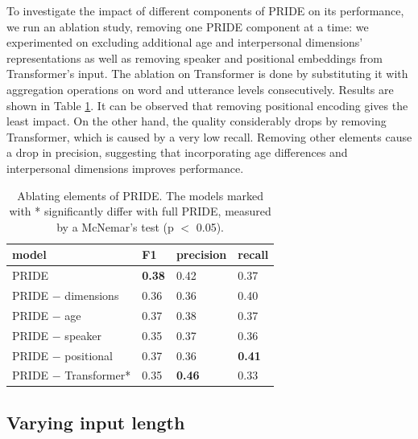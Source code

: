 To investigate the impact of different components of PRIDE on its performance,
we run an ablation study, removing one PRIDE component at a time: we experimented on excluding additional age and interpersonal dimensions' representations as well as removing speaker and positional embeddings from Transformer's input.
The ablation on Transformer is done by substituting it with aggregation operations on word and utterance levels consecutively. 
Results are shown in Table \ref{tab:ablation}. 
It can be observed that removing positional encoding gives the least impact. On the other hand, the quality considerably drops by removing Transformer, which is caused by a very low recall. Removing other elements cause a drop in precision, suggesting that incorporating age differences and interpersonal dimensions improves performance.

\begin{table}[t!]
\centering
\begin{adjustbox}{width=0.53\textwidth}
\begin{tabular}{@{}llll@{}}
\textbf{model}           & \textbf{F1}   & \textbf{precision} & \textbf{recall} \\ \toprule
PRIDE               & \textbf{0.38}     & 0.42            & 0.37         \\ \midrule
PRIDE $-$ dimensions  & 0.36     & 0.36            & 0.40          \\
PRIDE $-$ age         & 0.37     & 0.38            & 0.37         \\
PRIDE $-$ speaker     & 0.35     & 0.37            & 0.36         \\
PRIDE $-$ positional  & 0.37     & 0.36            & \textbf{0.41}         \\
PRIDE $-$ Transformer* & 0.35     & \textbf{0.46}            & 0.33        
\end{tabular}
\end{adjustbox}
\caption{Ablating elements of PRIDE. The models marked with * significantly differ with full PRIDE, measured by a McNemar’s test (p $<$ 0.05). 
}
\label{tab:ablation}
\end{table}

\subsection{Varying input length}

